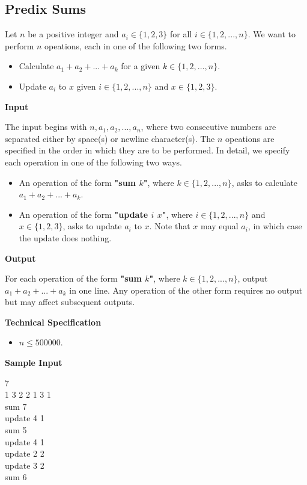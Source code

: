 \subsection{Predix Sums}
Let $n$ be a positive integer and $a_i \in \{1, 2, 3\}$ for all $i \in \{1, 2, ..., n\}$. We want to perform $n$ opeations, each in one of the following two forms.

\begin{itemize}
\item Calculate $a_1+a_2+...+a_k$ for a given $k \in \{1, 2, ..., n\}$.
\item Update $a_i$ to $x$ given $i \in \{1, 2, ..., n\}$ and $x \in \{1, 2, 3\}$.
\end{itemize}

\begin{flushleft}
{\color{red} \textbf{Input}}
\end{flushleft}
The input begins with $n, a_1, a_2, ..., a_n$, where two consecutive numbers are separated either by space(s) or newline character(s). The $n$ opeations are specified in the order in which they are to be performed. In detail, we specify each operation in one of the following two ways.

\begin{itemize}
\item An operation of the form \textbf{"sum $k$"}, where $k \in \{1, 2, ..., n\}$, asks to calculate $a_1+a_2+...+a_k$.
\item An operation of the form \textbf{"update $i$ $x$"}, where $i \in \{1, 2, ..., n\}$ and $x \in \{1, 2, 3\}$, asks to update $a_i$ to $x$. Note that $x$ may equal $a_i$, in which case the update does nothing.
\end{itemize}

\begin{flushleft}
{\color{red} \textbf{Output}}
\end{flushleft}
For each operation of the form \textbf{"sum $k$"}, where $k \in \{1, 2, ..., n\}$, output $a_1+a_2+...+a_k$ in one line. Any operation of the other form requires no output but may affect subsequent outputs.

\begin{flushleft}
{\color{red} \textbf{Technical Specification}}
\end{flushleft}
\begin{itemize}
\item $n \leq 500000$.
\end{itemize}

\begin{flushleft}
{\color{red} \textbf{Sample Input}}
\end{flushleft}
\begin{flushleft}
7\\
1 3 2 2 1 3 1\\
sum 7\\
update 4 1\\
sum 5\\
update 4 1\\
update 2 2\\
update 3 2\\
sum 6\\
\end{flushleft}

